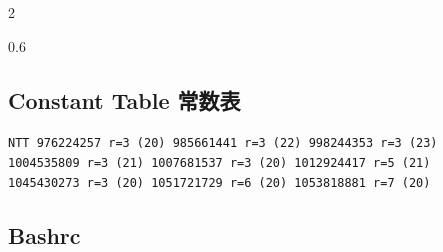 \documentclass[titlepage, a4paper]{article}
\begin{document}
\begin{multicols}{2}
\begin{spacing}{0.6}
				\subsection{Constant Table 常数表}\label{randomprimes}
				\begin{small}
					\setlength{\parindent}{0em}\setlength{\parskip}{0em}\renewcommand{\baselinestretch}{.8}
					\texttt{}
					\texttt{NTT 976224257 r=3 (20)
					985661441 r=3 (22)
					998244353 r=3 (23)\\
					1004535809 r=3 (21)
					1007681537 r=3 (20)
					1012924417 r=5 (21)\\
					1045430273 r=3 (20)
					1051721729 r=6 (20)
					1053818881 r=7 (20)				
					}
				\end{small}
				
				\subsection*{Bashrc}
				\inputminted{sh}{src/Miscellany/bashrc}

\end{spacing}
\end{multicols}
\end{document}
